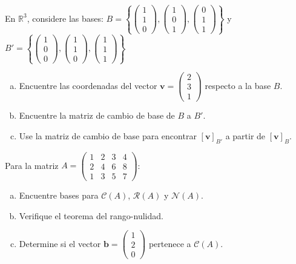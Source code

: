 \begin{prob} En $\mathbb{R}^3$, considere las bases: $B = \left\{\begin{pmatrix} 1 \\ 1 \\ 0 \end{pmatrix}, \begin{pmatrix} 1 \\ 0 \\ 1 \end{pmatrix}, \begin{pmatrix} 0 \\ 1 \\ 1 \end{pmatrix}\right\}$ y $B' = \left\{\begin{pmatrix} 1 \\ 0 \\ 0 \end{pmatrix}, \begin{pmatrix} 1 \\ 1 \\ 0 \end{pmatrix}, \begin{pmatrix} 1 \\ 1 \\ 1 \end{pmatrix}\right\}$

\begin{enumerate}[(a)]
\item Encuentre las coordenadas del vector $\mathbf{v} = \begin{pmatrix} 2 \\ 3 \\ 1 \end{pmatrix}$ respecto a la base $B$.
\item Encuentre la matriz de cambio de base de $B$ a $B'$.
\item Use la matriz de cambio de base para encontrar $[\mathbf{v}]_{B'}$ a partir de $[\mathbf{v}]_B$.
\end{enumerate}
\end{prob}


\begin{prob} Para la matriz $A = \begin{pmatrix} 1 & 2 & 3 & 4 \\ 2 & 4 & 6 & 8 \\ 1 & 3 & 5 & 7 \end{pmatrix}$:
\begin{enumerate}[(a)]
\item Encuentre bases para $\mathcal{C}(A)$, $\mathcal{R}(A)$ y $\mathcal{N}(A)$.
\item Verifique el teorema del rango-nulidad.
\item Determine si el vector $\mathbf{b} = \begin{pmatrix} 1 \\ 2 \\ 0 \end{pmatrix}$ pertenece a $\mathcal{C}(A)$.
\end{enumerate}
\end{prob}

